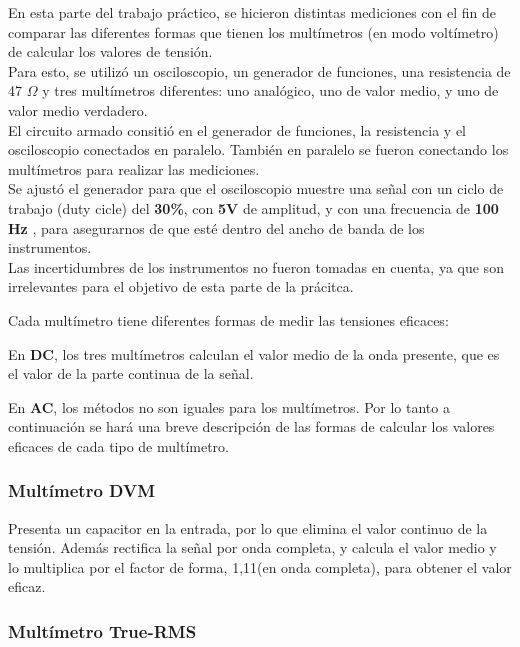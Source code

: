 \documentclass{article}
\begin{document}
En esta parte del trabajo práctico, se hicieron distintas mediciones con el fin de comparar las diferentes formas que tienen los multímetros (en modo voltímetro) de calcular los valores de tensión.\\
\indent Para esto, se utilizó un osciloscopio, un generador de funciones, una resistencia de 47 $\Omega$ y tres multímetros diferentes: uno analógico, uno de valor medio, y uno de valor medio verdadero.\\
\indent El circuito armado consitió en el generador de funciones, la resistencia y el osciloscopio conectados en paralelo. También en paralelo se fueron conectando los multímetros para realizar las mediciones. \\
\indent Se ajustó el generador para que el osciloscopio muestre una señal con un ciclo de trabajo (duty cicle) del \textbf{30\%},
con \textbf{5V} de amplitud, y con una frecuencia de \textbf{100 Hz} , para asegurarnos de que esté dentro del ancho de banda de los instrumentos.\\
\indent Las incertidumbres de los instrumentos no fueron tomadas en cuenta, ya que son irrelevantes para el objetivo de esta parte de la prácitca.
	\par
	Cada multímetro tiene diferentes formas de medir las tensiones eficaces:
	\medskip

En \textbf{DC}, los tres multímetros calculan el valor medio de la onda presente, que es el valor de la parte continua de la señal.

En \textbf{AC}, los métodos no son iguales para los multímetros. Por lo tanto a continuación se hará una breve descripción de las formas de calcular los valores eficaces de cada tipo de multímetro.
\bigskip


\subsubsection{Multímetro DVM}

Presenta un capacitor en la entrada, por lo que elimina el valor continuo de la tensión. Además rectifica la señal por onda completa, y calcula el valor medio y lo multiplica por el factor de forma, 1,11(en onda completa), para obtener el valor eficaz.\\
\smallskip



\subsubsection{Multímetro True-RMS}
\end{document}
